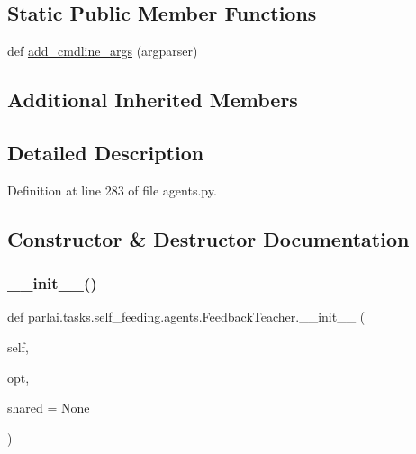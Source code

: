 \subsection*{Static Public Member Functions}
\begin{DoxyCompactItemize}
\item 
def \hyperlink{classparlai_1_1tasks_1_1self__feeding_1_1agents_1_1FeedbackTeacher_ad574b840424ec2d7096639c198af08c7}{add\+\_\+cmdline\+\_\+args} (argparser)
\end{DoxyCompactItemize}
\subsection*{Additional Inherited Members}


\subsection{Detailed Description}


Definition at line 283 of file agents.\+py.



\subsection{Constructor \& Destructor Documentation}
\mbox{\label{classparlai_1_1tasks_1_1self__feeding_1_1agents_1_1FeedbackTeacher_aafb96d12c0ae083d89bcf0365c2dfb6e}} 
\subsubsection{\texorpdfstring{\+\_\+\+\_\+init\+\_\+\+\_\+()}{\_\_init\_\_()}}
{\footnotesize\ttfamily def parlai.\+tasks.\+self\+\_\+feeding.\+agents.\+Feedback\+Teacher.\+\_\+\+\_\+init\+\_\+\+\_\+ (\begin{DoxyParamCaption}\item[{}]{self,  }\item[{}]{opt,  }\item[{}]{shared = {\ttfamily None} }\end{DoxyParamCaption})}



